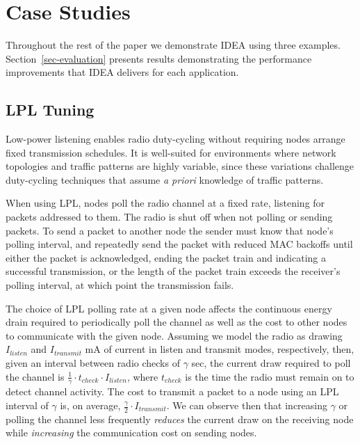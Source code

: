 \section{Case Studies}
\label{sec-casestudies}

Throughout the rest of the paper we demonstrate IDEA using three examples.
Section~\ref{sec-evaluation} presents results demonstrating the performance
improvements that IDEA delivers for each application.

\subsection{LPL Tuning}
\label{subsec-lpltuning}

Low-power listening enables radio duty-cycling without requiring nodes
arrange fixed transmission schedules. It is well-suited for environments
where network topologies and traffic patterns are highly variable, since
these variations challenge duty-cycling techniques that assume \textit{a
priori} knowledge of traffic patterns.

When using LPL, nodes poll the radio channel at a fixed rate, listening for
packets addressed to them. The radio is shut off when not polling or sending
packets. To send a packet to another node the sender must know that node's
polling interval, and repeatedly send the packet with reduced MAC backoffs
until either the packet is acknowledged, ending the packet train and
indicating a successful transmission, or the length of the packet train
exceeds the receiver's polling interval, at which point the transmission
fails.

The choice of LPL polling rate at a given node affects the continuous energy
drain required to periodically poll the channel as well as the cost to other
nodes to communicate with the given node. Assuming we model the radio as
drawing $I_{listen}$ and $I_{transmit}$ mA of current in listen and transmit
modes, respectively, then, given an interval between radio checks of $\gamma$
sec, the current draw required to poll the channel is $\frac{1}{\gamma} \cdot
t_{check} \cdot I_{listen}$, where $t_{check}$ is the time the radio must
remain on to detect channel activity. The cost to transmit a packet to a node
using an LPL interval of $\gamma$ is, on average, $\frac{\gamma}{2} \cdot
I_{transmit}$. We can observe then that increasing $\gamma$ or polling the
channel less frequently \textit{reduces} the current draw on the receiving
node while \textit{increasing} the communication cost on sending nodes.

